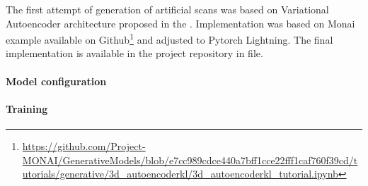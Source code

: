 The first attempt of generation of artificial scans was based on Variational Autoencoder architecture proposed in the \cite{rombach2022high}. Implementation was based on Monai\cite{Cardoso_MONAI_An_open-source_2022} example available on Github\footnote{\url{https://github.com/Project-MONAI/GenerativeModels/blob/e7cc989cdce440a7bff1cce22fff1caf760f39cd/tutorials/generative/3d_autoencoderkl/3d_autoencoderkl_tutorial.ipynb}} and adjusted to Pytorch Lightning. The final implementation is available in the project repository in file.

\paragraph{Model configuration}

\paragraph{Training}



